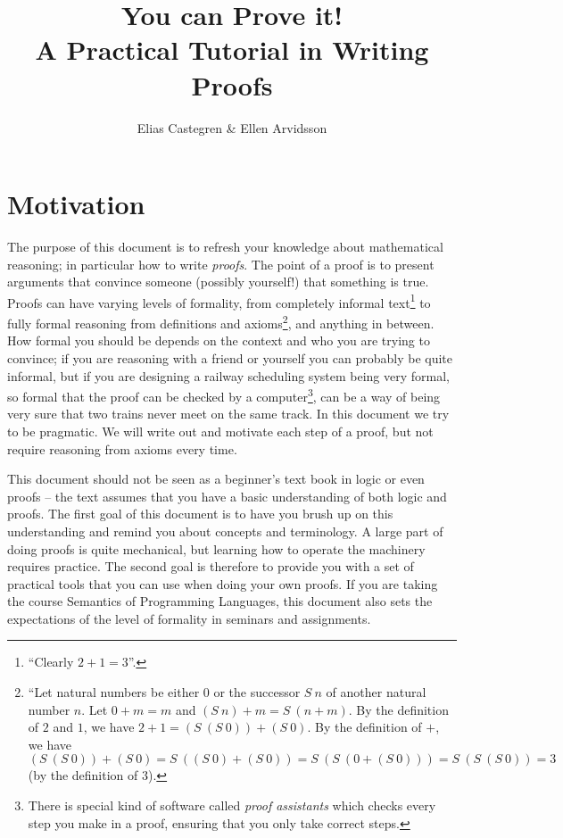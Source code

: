 \documentclass{tufte-handout}
\title[You can Prove it!]{You can Prove it!\\
{\large A Practical Tutorial in Writing Proofs}}
\author{Elias Castegren \& Ellen Arvidsson}
\begin{document}
\maketitle


\tableofcontents

\section{Motivation}

The purpose of this document is to refresh your knowledge about
mathematical reasoning; in particular how to write \emph{proofs}.
%
The point of a proof is to present arguments that convince someone
(possibly yourself!) that something is true.
%
Proofs can have varying levels of formality, from completely
informal text\footnote{``Clearly $2 + 1 = 3$''.} to fully formal
reasoning from definitions and axioms\footnote{``Let natural
  numbers be either 0 or the successor $S~n$ of another natural
  number $n$. Let $0 + m = m$ and $(S~n)+m = S~(n+m)$. By the
  definition of $2$ and $1$, we have $2 + 1 = (S~(S~0)) + (S~0)$.
  By the definition of $+$, we have
  $(S~(S~0)) + (S~0) = S~((S~0) + (S~0)) = S~(S~(0 + (S~0))) =
  S~(S~(S~0)) = 3$ (by the definition of $3$). \vspace{5mm}}, and anything
in between.
%
How formal you should be depends on the context and who you are
trying to convince; if you are reasoning with a friend or yourself
you can probably be quite informal, but if you are designing a
railway scheduling system being very formal, so formal that the
proof can be checked by a computer\footnote{There is special kind of software called \emph{proof assistants}
  which checks every step you make in a proof, ensuring that you
  only take correct steps.}, can be a way of being very sure that
two trains never meet on the same track.
%
In this document we try to be pragmatic. We will write out and
motivate each step of a proof, but not require reasoning from
axioms every time.

This document should not be seen as a beginner's text book in
logic or even proofs -- the text assumes that you have a basic
understanding of both logic and proofs. The first goal of this
document is to have you brush up on this understanding and remind
you about concepts and terminology. A large part of doing proofs
is quite mechanical, but learning how to operate the machinery
requires practice. The second goal is therefore to provide you
with a set of practical tools that you can use when doing your own
proofs.
%
If you are taking the course Semantics of Programming Languages,
this document also sets the expectations of the level of formality
in seminars and assignments.
\end{document}
